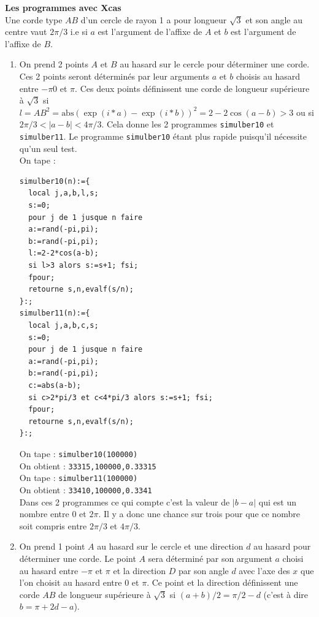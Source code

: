 \documentclass[a4paper,11pt]{book}
\begin{document}
{\bf Les programmes avec Xcas}\\
Une corde type $AB$ d'un cercle de rayon 1 a pour longueur $\sqrt 3$ et son 
angle au centre vaut $2\pi/3$ i.e si $a$ est l'argument de l'affixe de $A$ et 
$b$ est l'argument de l'affixe de $B$.
\begin{enumerate}
\item On prend 2 points $A$ et $B$ au hasard sur le cercle pour d\'eterminer 
une corde. Ces 2 points seront d\'etermin\'es par leur arguments $a$ et $b$ 
choisis au hasard entre $-\pi$0 et $\pi$. Ces deux points d\'efinissent une 
corde de longueur sup\'erieure  \`a $\sqrt 3$ si \\
$l=AB^2=\mbox{abs}(\exp(i*a)-\exp(i*b))^2=2-2\cos(a-b)> 3$ ou si \\
$2\pi/3<|a-b|<4\pi/3$.
Cela donne les 2 programmes {\tt simulber10} et {\tt simulber11}.
Le programme {\tt simulber10} \'etant plus rapide puisqu'il n\'ecessite qu'un 
seul test.\\
On tape :
\begin{verbatim}
simulber10(n):={
  local j,a,b,l,s;
  s:=0;
  pour j de 1 jusque n faire
  a:=rand(-pi,pi);
  b:=rand(-pi,pi);
  l:=2-2*cos(a-b);
  si l>3 alors s:=s+1; fsi;
  fpour;
  retourne s,n,evalf(s/n);
}:;
simulber11(n):={
  local j,a,b,c,s;
  s:=0;
  pour j de 1 jusque n faire
  a:=rand(-pi,pi);
  b:=rand(-pi,pi);
  c:=abs(a-b);
  si c>2*pi/3 et c<4*pi/3 alors s:=s+1; fsi;
  fpour;
  retourne s,n,evalf(s/n);
}:;
\end{verbatim}
On tape :
{\tt simulber10(100000) }\\
On obtient : {\tt 33315,100000,0.33315}\\
On tape :
{\tt simulber11(100000) }\\
On obtient : {\tt 33410,100000,0.3341}\\
Dans ces 2 programmes ce qui compte c'est la valeur de $|b-a|$ qui est un 
nombre entre 0 et $2\pi$. Il y a donc une chance sur trois pour que ce nombre 
soit compris entre $2\pi/3$ et $4\pi/3$.
\item On prend 1 point $A$ au hasard sur le cercle et une direction $d$ au 
  hasard pour d\'eterminer une corde. Le point $A$ sera d\'etermin\'e par son 
 argument $a$ choisi au hasard entre $-\pi$ et $\pi$ et la direction $D$ par son
angle $d$ avec l'axe des $x$ que l'on choisit au hasard entre 0 et $\pi$. 
 Ce point et la direction d\'efinissent une corde $AB$ de longueur sup\'erieure 
  \`a $\sqrt 3$ si $(a+b)/2=\pi/2-d$ (c'est \`a dire $b=\pi+2d-a$).\\

\end{enumerate}
\end{document}

